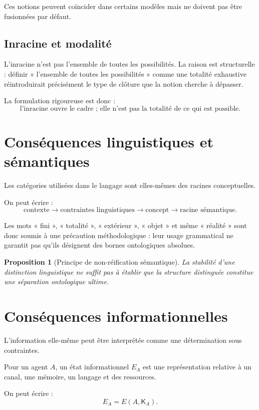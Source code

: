 \documentclass[11pt,a4paper]{article}
\newtheorem{proposition}{Proposition}[section]
\newcommand{\Cadre}{\mathsf{K}}
\begin{document}
Ces notions peuvent coïncider dans certains modèles mais ne doivent pas être
fusionnées par défaut.

\subsection{Inracine et modalité}

L'inracine n'est pas l'ensemble de toutes les possibilités. La raison est
structurelle : définir « l'ensemble de toutes les possibilités » comme une
totalité exhaustive réintroduirait précisément le type de clôture que la notion
cherche à dépasser.

La formulation rigoureuse est donc :
\[
\boxed{
\text{l'inracine ouvre le cadre ; elle n'est pas la totalité de ce qui est possible.}
}
\]

\section{Conséquences linguistiques et sémantiques}

Les catégories utilisées dans le langage sont elles-mêmes des racines
conceptuelles.

On peut écrire :
\[
\text{contexte}
\to
\text{contraintes linguistiques}
\to
\text{concept}
\to
\text{racine sémantique}.
\]

Les mots « fini », « totalité », « extérieur », « objet » et même « réalité »
sont donc soumis à une précaution méthodologique : leur usage grammatical
ne garantit pas qu'ils désignent des bornes ontologiques absolues.

\begin{proposition}[Principe de non-réification sémantique]
La stabilité d'une distinction linguistique ne suffit pas à établir que la
structure distinguée constitue une séparation ontologique ultime.
\end{proposition}

\section{Conséquences informationnelles}

L'information elle-même peut être interprétée comme une détermination sous
contraintes.

Pour un agent \(A\), un état informationnel \(E_A\) est une représentation
relative à un canal, une mémoire, un langage et des ressources.

On peut écrire :
\[
E_A=E(A,\Cadre_A).
\]
\end{document}
